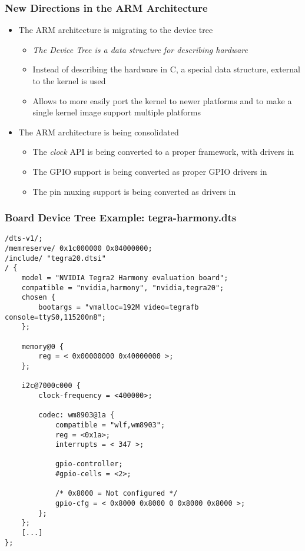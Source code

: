 \begin{frame}
  \frametitle{New Directions in the ARM Architecture}
  \begin{itemize}
  \item The ARM architecture is migrating to the device tree
    \begin{itemize}
    \item \emph{The Device Tree is a data structure for describing
        hardware}
    \item Instead of describing the hardware in C, a special data
      structure, external to the kernel is used
    \item Allows to more easily port the kernel to newer platforms and
      to make a single kernel image support multiple platforms
    \end{itemize}
  \item The ARM architecture is being consolidated
    \begin{itemize}
    \item The \emph{clock} API is being converted to a proper
      framework, with drivers in 
    \item The GPIO support is being converted as proper GPIO drivers
      in 
    \item The pin muxing support is being converted as drivers in
    \end{itemize}
  \end{itemize}
\end{frame}

\begin{frame}[fragile]
\frametitle{Board Device Tree Example: tegra-harmony.dts}
{\tiny
\begin{verbatim}
/dts-v1/;
/memreserve/ 0x1c000000 0x04000000;
/include/ "tegra20.dtsi"
/ {
    model = "NVIDIA Tegra2 Harmony evaluation board";
    compatible = "nvidia,harmony", "nvidia,tegra20";
    chosen {
        bootargs = "vmalloc=192M video=tegrafb console=ttyS0,115200n8";
    };

    memory@0 {
        reg = < 0x00000000 0x40000000 >;
    };

    i2c@7000c000 {
        clock-frequency = <400000>;

        codec: wm8903@1a {
            compatible = "wlf,wm8903";
            reg = <0x1a>;
            interrupts = < 347 >;

            gpio-controller;
            #gpio-cells = <2>;

            /* 0x8000 = Not configured */
            gpio-cfg = < 0x8000 0x8000 0 0x8000 0x8000 >;
        };
    };
    [...]
};
\end{verbatim}
}
\end{frame}

